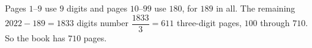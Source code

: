 Pages $1$--$9$ use $9$ digits and pages $10$--$99$ use $180$, for $189$ in all. The remaining $2022-189=1833$ digits number $\dfrac{1833}{3}=611$ three-digit pages, $100$ through $710$. So the book has $\boxed{710}$ pages.
